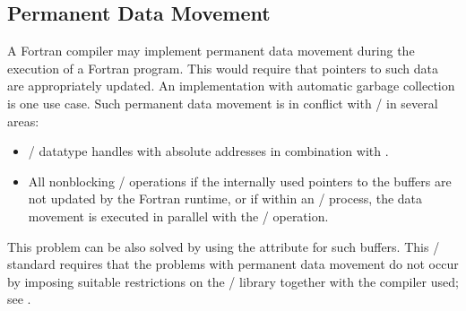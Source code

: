 \subsection{Permanent Data Movement}
\label{sec:f90-problems:perm-data-movements}

A Fortran compiler may implement permanent data movement during the
execution of a Fortran program. This would require that pointers
to such data are appropriately updated.
An implementation with automatic garbage collection is one use case.
Such permanent data movement is in conflict with \MPI/ in several areas:
\begin{itemize}
\item \MPI/ datatype handles with absolute addresses in combination
      with .
\item All nonblocking \MPI/ operations
      if the internally used
      pointers to the buffers are not updated by the Fortran
      runtime, or if within an \MPI/ process,
      the data movement is executed in parallel with the \MPI/ operation.
\end{itemize}
This problem can be also solved by using the 
attribute for such buffers.
This \MPI/ standard requires that the problems with permanent data movement
do not occur by imposing suitable restrictions on
the \MPI/ library together with the compiler used;
see .

